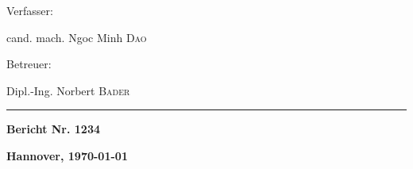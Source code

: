 \begin{minipage}[t]{0.5\textwidth}
    \begin{flushleft}
        Verfasser:

        cand. mach. Ngoc Minh \textsc{Dao}
    \end{flushleft}
\end{minipage}
%
\begin{minipage}[t]{0.5\textwidth}
    \begin{flushright}
        Betreuer:

        Dipl.-Ing. Norbert \textsc{Bader}
    \end{flushright}
\end{minipage}

\rule{\textwidth}{1pt}

\begin{minipage}[t]{0.5\textwidth}
    \begin{flushleft}
        \textbf{Bericht Nr. 1234}
    \end{flushleft}
\end{minipage}
%
\begin{minipage}[t]{0.5\textwidth}
    \begin{flushright}
        \textbf{Hannover, \today}
    \end{flushright}
\end{minipage}

